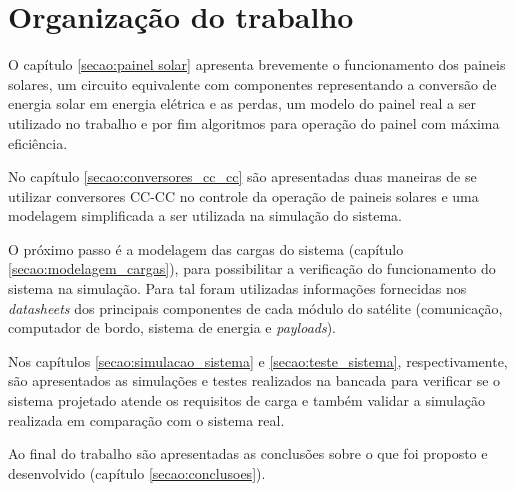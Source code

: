 \section{Organização do trabalho}

O capítulo \ref{secao:painel solar} apresenta brevemente o funcionamento dos paineis solares, um circuito equivalente com componentes representando a conversão de energia solar em energia elétrica e as perdas, um modelo do painel real a ser utilizado no trabalho e por fim algoritmos para operação do painel com máxima eficiência.

No capítulo \ref{secao:conversores_cc_cc} são apresentadas duas maneiras de se utilizar conversores CC-CC no controle da operação de paineis solares e uma modelagem simplificada a ser utilizada na simulação do sistema.

O próximo passo é a modelagem das cargas do sistema (capítulo \ref{secao:modelagem_cargas}), para possibilitar a verificação do funcionamento do sistema na simulação. Para tal foram utilizadas informações fornecidas nos \textit{datasheets} dos principais componentes de cada módulo do satélite (comunicação, computador de bordo, sistema de energia e \textit{payloads}).

Nos capítulos \ref{secao:simulacao_sistema} e \ref{secao:teste_sistema}, respectivamente, são apresentados as simulações e testes realizados na bancada para verificar se o sistema projetado atende os requisitos de carga e também validar a simulação realizada em comparação com o sistema real.

Ao final do trabalho são apresentadas as conclusões sobre o que foi proposto e desenvolvido (capítulo \ref{secao:conclusoes}).


